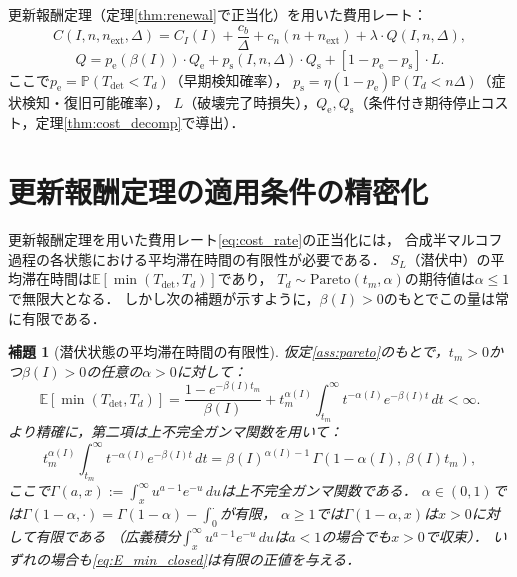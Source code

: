 \documentclass[12pt,a4paper]{article}
\theoremstyle{plain}
\newtheorem{lemma}[theorem]{補題}
\theoremstyle{definition}
\theoremstyle{remark}
\newcommand{\E}{\mathbb{E}}
\newcommand{\Prob}{\mathbb{P}}
\newcommand{\pe}{p_{\mathrm{e}}}
\newcommand{\ps}{p_{\mathrm{s}}}
\newcommand{\Qe}{Q_{\mathrm{e}}}
\newcommand{\Qs}{Q_{\mathrm{s}}}
\newcommand{\Tdet}{T_{\mathrm{det}}}
\newcommand{\betaI}{\beta(I)}
\newcommand{\alphI}{\alpha(I)}
\begin{document}
更新報酬定理（定理\ref{thm:renewal}で正当化）を用いた費用レート：
\begin{equation}\label{eq:cost_rate}
C(I,n,n_{\mathrm{ext}},\Delta)
= C_I(I) + \frac{c_b}{\Delta} + c_n(n+n_{\mathrm{ext}})
+ \lambda\cdot Q(I,n,\Delta),
\end{equation}
\begin{equation}\label{eq:Q_decomp}
Q = \pe(\betaI)\cdot\Qe
  + \ps(I,n,\Delta)\cdot\Qs
  + [1-\pe-\ps]\cdot L.
\end{equation}
ここで$\pe=\Prob(\Tdet<T_d)$（早期検知確率），
$\ps=\eta(1-\pe)\Prob(T_d<n\Delta)$（症状検知・復旧可能確率），
$L$（破壊完了時損失），$\Qe,\Qs$（条件付き期待停止コスト，定理\ref{thm:cost_decomp}で導出）．

\section{更新報酬定理の適用条件の精密化}
\label{sec:renewal}

更新報酬定理を用いた費用レート\eqref{eq:cost_rate}の正当化には，
合成半マルコフ過程の各状態における平均滞在時間の有限性が必要である．
$S_L$（潜伏中）の平均滞在時間は$\E[\min(\Tdet,T_d)]$であり，
$T_d\sim\mathrm{Pareto}(t_m,\alpha)$の期待値は$\alpha\le1$で無限大となる．
しかし次の補題が示すように，$\betaI>0$のもとでこの量は常に有限である．

\begin{lemma}[潜伏状態の平均滞在時間の有限性]\label{lem:sojourn_finite}
仮定\ref{ass:pareto}のもとで，$t_m>0$かつ$\betaI>0$の任意の$\alpha>0$に対して：
\begin{equation}\label{eq:E_min_formula}
  \E\!\left[\min(\Tdet,T_d)\right]
  = \frac{1-e^{-\betaI t_m}}{\betaI}
  + t_m^{\alphI}\!\int_{t_m}^{\infty}\!\! t^{-\alphI}e^{-\betaI t}\,dt
  < \infty.
\end{equation}
より精確に，第二項は上不完全ガンマ関数を用いて：
\begin{equation}\label{eq:E_min_closed}
  t_m^{\alphI}\int_{t_m}^{\infty}t^{-\alphI}e^{-\betaI t}\,dt
  = \betaI^{\alphI-1}\,\Gamma(1-\alphI,\,\betaI t_m),
\end{equation}
ここで$\Gamma(a,x):=\int_x^\infty u^{a-1}e^{-u}\,du$は上不完全ガンマ関数である．
$\alpha\in(0,1)$では$\Gamma(1-\alpha,\cdot)=\Gamma(1-\alpha)-\int_0^{\cdot}$が有限，
$\alpha\ge1$では$\Gamma(1-\alpha,x)$は$x>0$に対して有限である
（広義積分$\int_x^\infty u^{a-1}e^{-u}\,du$は$a<1$の場合でも$x>0$で収束）．
いずれの場合も\eqref{eq:E_min_closed}は有限の正値を与える．
\end{lemma}
\end{document}
